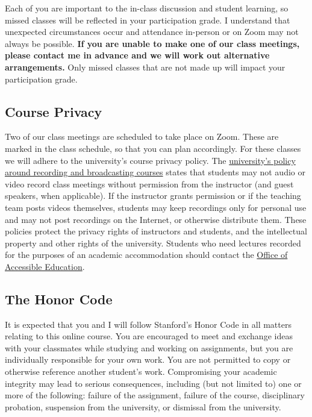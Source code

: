 \documentclass[11pt,]{article}
\begin{document}
Each of you are important to the in-class discussion and student
learning, so missed classes will be reflected in your participation
grade. I understand that unexpected circumstances occur and attendance
in-person or on Zoom may not always be possible. \textbf{If you are
unable to make one of our class meetings, please contact me in advance
and we will work out alternative arrangements.} Only missed classes that
are not made up will impact your participation grade.

\hypertarget{course-privacy}{%
\subsection{Course Privacy}\label{course-privacy}}

Two of our class meetings are scheduled to take place on Zoom. These are
marked in the class schedule, so that you can plan accordingly. For
these classes we will adhere to the university's course privacy policy.
The
\href{https://library.stanford.edu/using/copyright-reminder/common-situations/recording-broadcasting-courses}{university's
policy around recording and broadcasting courses} states that students
may not audio or video record class meetings without permission from the
instructor (and guest speakers, when applicable). If the instructor
grants permission or if the teaching team posts videos themselves,
students may keep recordings only for personal use and may not post
recordings on the Internet, or otherwise distribute them. These policies
protect the privacy rights of instructors and students, and the
intellectual property and other rights of the university. Students who
need lectures recorded for the purposes of an academic accommodation
should contact the \href{https://oae.stanford.edu/}{Office of Accessible
Education}.

\hypertarget{the-honor-code}{%
\subsection{The Honor Code}\label{the-honor-code}}

It is expected that you and I will follow Stanford's Honor Code in all
matters relating to this online course. You are encouraged to meet and
exchange ideas with your classmates while studying and working on
assignments, but you are individually responsible for your own work. You
are not permitted to copy or otherwise reference another student's work.
Compromising your academic integrity may lead to serious consequences,
including (but not limited to) one or more of the following: failure of
the assignment, failure of the course, disciplinary probation,
suspension from the university, or dismissal from the university.
\end{document}
